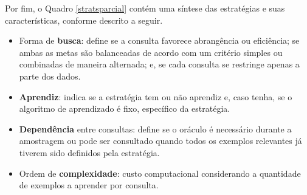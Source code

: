 Por fim, o Quadro \ref{stratsparcial} contém uma síntese das estratégias e suas características, conforme descrito a seguir.
\begin{itemize}
   \item Forma de \textbf{busca}: define se a consulta favorece abrangência ou eficiência; se ambas as metas são balanceadas de acordo com um critério simples ou combinadas de maneira alternada; e, se cada consulta se restringe apenas a parte dos dados.
   \item \textbf{Aprendiz}: indica se a estratégia tem ou não aprendiz e, caso tenha, se o algoritmo de aprendizado é fixo, específico da estratégia.
   \item \textbf{Dependência} entre consultas: define se o oráculo é necessário durante a amostragem ou pode ser consultado quando todos os exemplos relevantes já tiverem sido definidos pela estratégia.
   \item Ordem de \textbf{complexidade}: custo computacional considerando a quantidade de exemplos a aprender por consulta.
\end{itemize}



